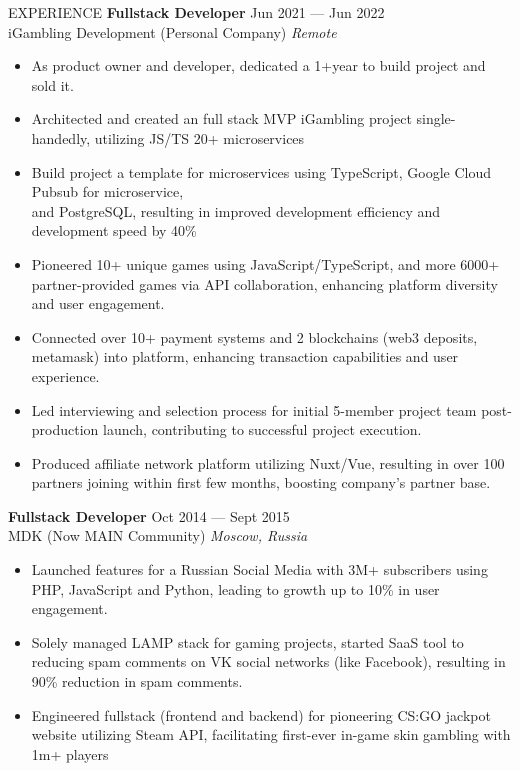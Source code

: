 \documentclass{template} %
\begin{document}
\begin{rSection}{EXPERIENCE}
\textbf{Fullstack Developer} \hfill Jun 2021 --- Jun 2022\\
iGambling Development (Personal Company) \hfill \textit{Remote}
 \begin{itemize}
    \itemsep -3pt {} 
     \item As product owner and developer, dedicated a 1+year to build project and sold it.
     \item Architected and created an full stack MVP iGambling project single-handedly, utilizing JS/TS 20+ microservices
     \item Build project a template for microservices using TypeScript, Google Cloud Pubsub for microservice,\\and PostgreSQL, resulting in improved development efficiency and development speed by 40\%
     \item Pioneered 10+ unique games using JavaScript/TypeScript, and more 6000+ partner-provided games via API collaboration, enhancing platform diversity and user engagement.
     \item Connected over 10+ payment systems and 2 blockchains (web3 deposits, metamask) into platform, enhancing transaction capabilities and user experience.
     \item Led interviewing and selection process for initial 5-member project team post-production launch, contributing to successful project execution.
     \item Produced affiliate network platform utilizing Nuxt/Vue, resulting in over 100 partners joining within first few months, boosting company's partner base.
 \end{itemize}
 \textbf{Fullstack Developer} \hfill Oct 2014 --- Sept 2015\\
MDK (Now MAIN Community) \hfill \textit{Moscow, Russia}
 \begin{itemize}
    \itemsep -3pt {} 
     \item Launched features for a Russian Social Media with 3M+ subscribers using PHP, JavaScript and Python, leading to growth up to 10\% in user engagement.
     \item Solely managed LAMP stack for gaming projects, started SaaS tool to reducing spam comments on VK social networks (like Facebook), resulting in 90\% reduction in spam comments.
     \item Engineered fullstack (frontend and backend) for pioneering CS:GO jackpot website utilizing Steam API, facilitating first-ever in-game skin gambling with 1m+ players
 \end{itemize}

\end{rSection} 
\end{document}
